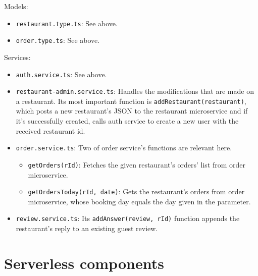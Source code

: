 Models:
\begin{itemize}
	\item \verb+restaurant.type.ts+: See above.
	\item \verb+order.type.ts+: See above.
\end{itemize}
Services:
\begin{itemize}
	\item \verb+auth.service.ts+: See above.
	\item \verb+restaurant-admin.service.ts+: Handles the modifications that are made on a restaurant. Its most important function is \verb+addRestaurant(restaurant)+, which posts a new restaurant's JSON to the restaurant microservice and if it's successfully created, calls auth service to create a new user with the received restaurant id.
	\item \verb+order.service.ts+: Two of order service's functions are relevant here.
	\begin{itemize}
		\item\verb+getOrders(rId)+: Fetches the given restaurant's orders' list from order microservice.
		\item\verb+getOrdersToday(rId, date)+: Gets the restaurant's orders from order microservice, whose booking day equals the day given in the parameter.
	\end{itemize}
	\item \verb+review.service.ts+: Its \verb+addAnswer(review, rId)+ function appends the restaurant's reply to an existing guest review. 
\end{itemize}

\section{Serverless components}
